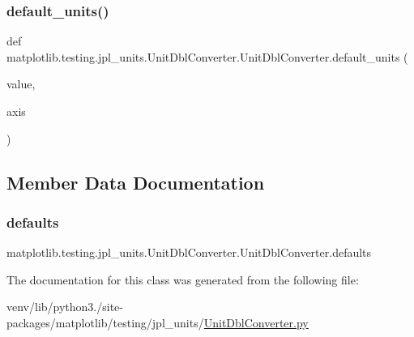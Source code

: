 \subsubsection{\texorpdfstring{default\+\_\+units()}{default\_units()}}
{\footnotesize\ttfamily def matplotlib.\+testing.\+jpl\+\_\+units.\+Unit\+Dbl\+Converter.\+Unit\+Dbl\+Converter.\+default\+\_\+units (\begin{DoxyParamCaption}\item[{}]{value,  }\item[{}]{axis }\end{DoxyParamCaption})\hspace{0.3cm}{\ttfamily [static]}}



\subsection{Member Data Documentation}
\mbox{\label{classmatplotlib_1_1testing_1_1jpl__units_1_1UnitDblConverter_1_1UnitDblConverter_a92b73a18b23f3d5dee60ae1410ae4d82}} 
\subsubsection{\texorpdfstring{defaults}{defaults}}
{\footnotesize\ttfamily matplotlib.\+testing.\+jpl\+\_\+units.\+Unit\+Dbl\+Converter.\+Unit\+Dbl\+Converter.\+defaults\hspace{0.3cm}{\ttfamily [static]}}



The documentation for this class was generated from the following file\+:\begin{DoxyCompactItemize}
\item 
venv/lib/python3./site-\/packages/matplotlib/testing/jpl\+\_\+units/\hyperlink{UnitDblConverter_8py}{Unit\+Dbl\+Converter.\+py}\end{DoxyCompactItemize}
